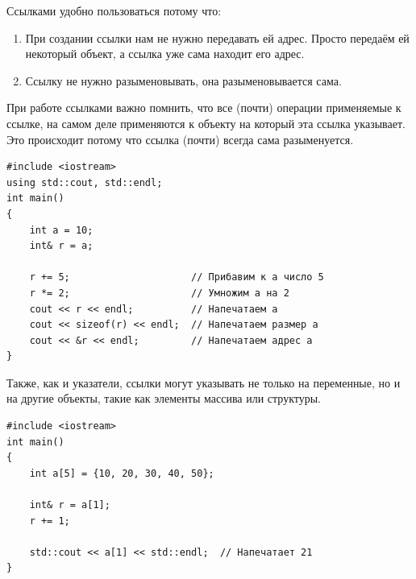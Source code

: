 \documentclass{article}
\begin{document}
Ссылками удобно пользоваться потому что:
\begin{enumerate}
\item При создании ссылки нам не нужно передавать ей адрес. Просто передаём ей некоторый объект, а ссылка уже сама находит его адрес.
\item Ссылку не нужно разыменовывать, она разыменовывается сама.
\end{enumerate}
При работе ссылками важно помнить, что все (почти) операции применяемые к ссылке, на самом деле применяются  к объекту на который эта ссылка указывает. Это происходит потому что ссылка (почти) всегда сама разыменуется.
\begin{lstlisting}
#include <iostream>
using std::cout, std::endl;
int main() 
{
    int a = 10;
    int& r = a;

    r += 5;                     // Прибавим к a число 5
    r *= 2;                     // Умножим a на 2
    cout << r << endl;          // Напечатаем a
    cout << sizeof(r) << endl;  // Напечатаем размер a
    cout << &r << endl;         // Напечатаем адрес a
}
\end{lstlisting}
Также, как и указатели, ссылки могут указывать не только на переменные, но и на другие объекты, такие как элементы массива или структуры.
\begin{lstlisting}
#include <iostream>
int main() 
{
    int a[5] = {10, 20, 30, 40, 50};

    int& r = a[1];
    r += 1;

    std::cout << a[1] << std::endl;  // Напечатает 21
}
\end{lstlisting}

\newpage
\end{document}
